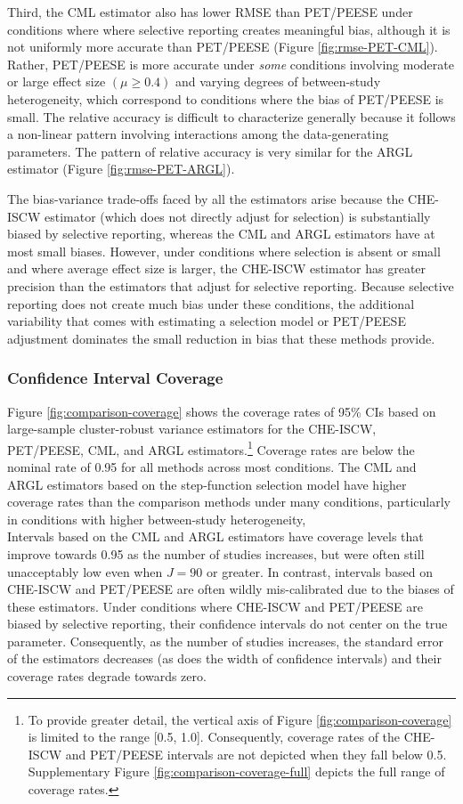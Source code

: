 \documentclass[
  man, donotrepeattitle,floatsintext]{apa7}
\begin{document}
Third, the CML estimator also has lower RMSE than PET/PEESE under conditions where where selective reporting creates meaningful bias, although it is not uniformly more accurate than PET/PEESE (Figure \ref{fig:rmse-PET-CML}).
Rather, PET/PEESE is more accurate under \emph{some} conditions involving moderate or large effect size \((\mu \geq 0.4)\) and varying degrees of between-study heterogeneity,
which correspond to conditions where the bias of PET/PEESE is small.
The relative accuracy is difficult to characterize generally because it follows a non-linear pattern involving interactions among the data-generating parameters.
The pattern of relative accuracy is very similar for the ARGL estimator (Figure \ref{fig:rmse-PET-ARGL}).

The bias-variance trade-offs faced by all the estimators arise because the CHE-ISCW estimator (which does not directly adjust for selection) is substantially biased by selective reporting, whereas the CML and ARGL estimators have at most small biases.
However, under conditions where selection is absent or small and where average effect size is larger, the CHE-ISCW estimator has greater precision than the estimators that adjust for selective reporting.
Because selective reporting does not create much bias under these conditions, the additional variability that comes with estimating a selection model or PET/PEESE adjustment dominates the small reduction in bias that these methods provide.

\subsubsection{Confidence Interval Coverage}\label{confidence-interval-coverage}

Figure \ref{fig:comparison-coverage} shows the coverage rates of 95\% CIs based on large-sample cluster-robust variance estimators for the CHE-ISCW, PET/PEESE, CML, and ARGL estimators.\footnote{To provide greater detail, the vertical axis of Figure \ref{fig:comparison-coverage} is limited to the range {[}0.5, 1.0{]}. Consequently, coverage rates of the CHE-ISCW and PET/PEESE intervals are not depicted when they fall below 0.5. Supplementary Figure \ref{fig:comparison-coverage-full} depicts the full range of coverage rates.}
Coverage rates are below the nominal rate of 0.95 for all methods across most conditions.
The CML and ARGL estimators based on the step-function selection model have higher coverage rates than the comparison methods under many conditions, particularly in conditions with higher between-study heterogeneity,\\
Intervals based on the CML and ARGL estimators have coverage levels that improve towards 0.95 as the number of studies increases, but were often still unacceptably low even when \(J = 90\) or greater.
In contrast, intervals based on CHE-ISCW and PET/PEESE are often wildly mis-calibrated due to the biases of these estimators.
Under conditions where CHE-ISCW and PET/PEESE are biased by selective reporting, their confidence intervals do not center on the true parameter. Consequently, as the number of studies increases, the standard error of the estimators decreases (as does the width of confidence intervals) and their coverage rates degrade towards zero.
\end{document}
